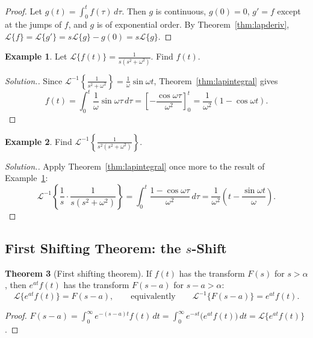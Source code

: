 \documentclass[11pt,a4paper]{article}
\theoremstyle{definition}
\newtheorem{thm}{Theorem}[subsection]
\newtheorem{exa}[thm]{Example}
\newenvironment{solution}
  {\renewcommand{\qedsymbol}{}\begin{proof}[\textit{Solution}.]}
  {\end{proof}}
\begin{document}
\begin{proof}
Let $g(t) = \int_0^t f(\tau)\,d\tau$. Then $g$ is continuous, $g(0) = 0$,
$g' = f$ except at the jumps of $f$, and $g$ is of exponential order. By
Theorem~\ref{thm:lapderiv}, $\mathcal{L}\{f\} = \mathcal{L}\{g'\} = s\mathcal{L}\{g\}
- g(0) = s\mathcal{L}\{g\}$.
\end{proof}

\begin{exa}
\label{ex:lapintsin}
Let $\mathcal{L}\{f(t)\} =\frac{1}{s(s^2 + \omega^2)}$. Find $f(t)$.
\end{exa}

\begin{solution}
Since $\mathcal{L}^{-1}\left\{\frac{1}{s^2 + \omega^2}\right\} = \frac{1}{\omega}
\sin \omega t$, Theorem~\ref{thm:lapintegral} gives
\[f(t) = \int^t_0 \frac{1}{\omega}\sin \omega \tau\, d\tau = \left[-\frac{\cos
\omega \tau}{\omega^2}\right]^t_0 = \frac{1}{\omega^2}(1-\cos \omega t) .\]
\end{solution}

\begin{exa}
\label{ex:lapintsquare}
Find $\mathcal{L}^{-1}\left\{\frac{1}{s^2(s^2 + \omega^2)}\right\}$.
\end{exa}

\begin{solution}
Apply Theorem~\ref{thm:lapintegral} once more to the result of
Example~\ref{ex:lapintsin}:
\[\mathcal{L}^{-1}\left\{\frac{1}{s}\cdot\frac{1}{s(s^2 + \omega^2)}\right\} =
\int_0^t\frac{1 - \cos\omega\tau}{\omega^2}\,d\tau = \frac{1}{\omega^2}\left(t -
\frac{\sin\omega t}{\omega}\right) .\]
\end{solution}

{\color[wave]{485}\subsection{First Shifting Theorem: the $s$-Shift}}

\begin{thm}[First shifting theorem]
\label{thm:sshift}
If $f(t)$ has the transform $F(s)$ for $s>\alpha$, then $e^{at}f(t)$ has the
transform $F(s -a)$ for $s-a>\alpha$:
\[\mathcal{L}\{e^{at}f(t)\} = F(s-a),\qquad\text{equivalently}\qquad
\mathcal{L}^{-1}\{F(s-a)\} = e^{at} f(t) .\]
\end{thm}

\begin{proof}
$F(s - a) = \int_0^\infty e^{-(s-a)t}f(t)\,dt = \int_0^\infty
e^{-st}\big(e^{at}f(t)\big)\,dt = \mathcal{L}\{e^{at}f(t)\}$.
\end{proof}
\end{document}
